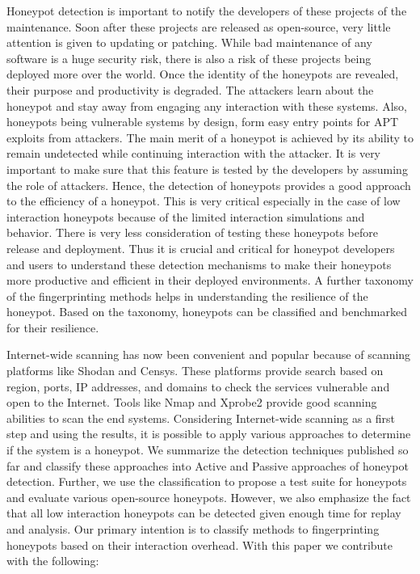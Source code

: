 Honeypot detection is important to notify the developers of these projects of the maintenance. Soon after these projects are released as open-source, very little attention is given to updating or patching. While bad maintenance of any software is a huge security risk, there is also a risk of these projects being deployed more over the world. Once the identity of the honeypots are revealed, their purpose and productivity is degraded. The attackers learn about the honeypot and stay away from engaging any interaction with these systems. Also, honeypots being vulnerable systems by design, form easy entry points for APT exploits from attackers. The main merit of a honeypot is achieved by its ability to remain undetected while continuing interaction with the attacker. It is very important to make sure that this feature is tested by the developers by assuming the role of attackers. Hence, the detection of honeypots provides a good approach to the efficiency of a honeypot. This is very critical especially in the case of low interaction honeypots because of the limited interaction simulations and behavior. There is very less consideration of testing these honeypots before release and deployment. Thus it is crucial and critical for honeypot developers and users to understand these detection mechanisms to make their honeypots more productive and efficient in their deployed environments. A further taxonomy of the fingerprinting methods helps in understanding the resilience of the honeypot. Based on the taxonomy, honeypots can be classified and benchmarked for their resilience. 


Internet-wide scanning has now been convenient and popular because of scanning platforms like Shodan and Censys. These platforms provide search based on region, ports, IP addresses, and domains to check the services vulnerable and open to the Internet. Tools like Nmap and Xprobe2 provide good scanning abilities to scan the end systems\cite{NMap}. Considering Internet-wide scanning as a first step and using the results, it is possible to apply various approaches to determine if the system is a honeypot. We summarize the detection techniques published so far and classify these approaches into Active and Passive approaches of honeypot detection. Further, we use the classification to propose a test suite for honeypots and evaluate various open-source honeypots. However, we also emphasize the fact that all low interaction honeypots can be detected given enough time for replay and analysis. Our primary intention is to classify methods to fingerprinting honeypots based on their interaction overhead. With this paper we contribute with the following:

